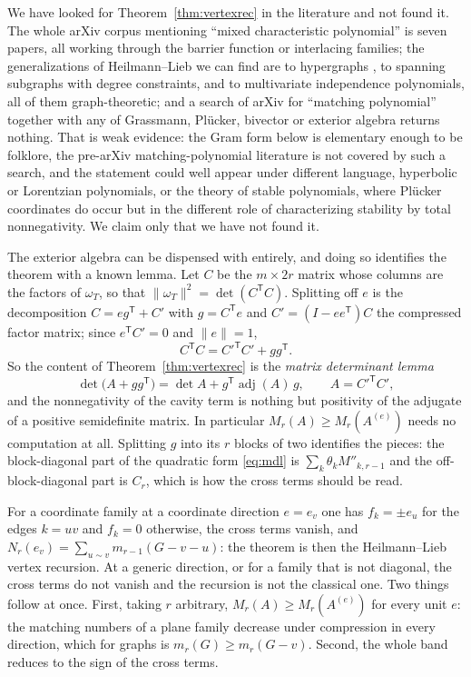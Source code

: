 \documentclass[11pt]{article}
\theoremstyle{remark}
\begin{document}
We have looked for Theorem~\ref{thm:vertexrec} in the literature and not found it. The
whole arXiv corpus mentioning ``mixed characteristic polynomial'' is seven papers, all
working through the barrier function or interlacing families; the generalizations of
Heilmann--Lieb we can find are to hypergraphs \cite{Zhang}, to spanning subgraphs with
degree constraints, and to multivariate independence polynomials, all of them
graph-theoretic; and a search of arXiv for ``matching polynomial'' together with any of
Grassmann, Pl\"ucker, bivector or exterior algebra returns nothing. That is weak evidence:
the Gram form below is elementary enough to be folklore, the pre-arXiv matching-polynomial
literature is not covered by such a search, and the statement could well appear under
different language, hyperbolic or Lorentzian polynomials, or the theory of stable
polynomials, where Pl\"ucker coordinates do occur but in the different role of
characterizing stability by total nonnegativity. We claim only that we have not found it.

The exterior algebra can be dispensed with entirely, and doing so identifies the
theorem with a known lemma. Let $C$ be the $m\times2r$ matrix whose columns are the
factors of $\omega_T$, so that $\|\omega_T\|^2=\det(C^{\mathsf T}C)$. Splitting off
$e$ is the decomposition $C=eg^{\mathsf T}+C'$ with $g=C^{\mathsf T}e$ and
$C'=(I-ee^{\mathsf T})C$ the compressed factor matrix; since $e^{\mathsf T}C'=0$ and
$\|e\|=1$,
\[
C^{\mathsf T}C=C'^{\mathsf T}C'+gg^{\mathsf T} .
\]
So the content of Theorem~\ref{thm:vertexrec} is the \emph{matrix determinant lemma}
\begin{equation}\label{eq:mdl}
\det\bigl(A+gg^{\mathsf T}\bigr)=\det A+g^{\mathsf T}\operatorname{adj}(A)\,g,
\qquad A=C'^{\mathsf T}C' ,
\end{equation}
and the nonnegativity of the cavity term is nothing but positivity of the adjugate of
a positive semidefinite matrix. In particular $M_r(A)\ge M_r(A^{(e)})$ needs no
computation at all. Splitting $g$ into its $r$ blocks of two identifies the pieces:
the block-diagonal part of the quadratic form \eqref{eq:mdl} is
$\sum_k\theta_kM''_{k,r-1}$ and the off-block-diagonal part is $C_r$, which is how the
cross terms should be read.

For a coordinate family at a coordinate direction $e=e_v$ one has $f_k=\pm e_u$ for
the edges $k=uv$ and $f_k=0$ otherwise, the cross terms vanish, and
$N_r(e_v)=\sum_{u\sim v}m_{r-1}(G-v-u)$: the theorem is then the Heilmann--Lieb
vertex recursion. At a generic direction, or for a family that is not diagonal, the
cross terms do not vanish and the recursion is not the classical one. Two things
follow at once. First, taking $r$ arbitrary, $M_r(A)\ge M_r(A^{(e)})$ for every unit
$e$: the matching numbers of a plane family decrease under compression in every
direction, which for graphs is $m_r(G)\ge m_r(G-v)$. Second, the whole band reduces
to the sign of the cross terms.
\end{document}
